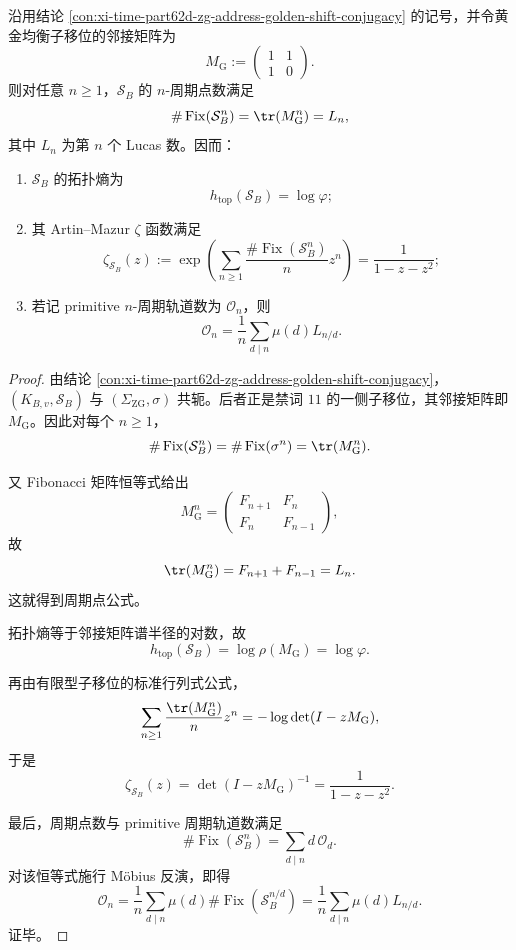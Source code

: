 \begin{conclusion}\label{con:xi-time-part62d-zg-address-lucas-entropy-zeta}
沿用结论 \ref{con:xi-time-part62d-zg-address-golden-shift-conjugacy} 的记号，并令黄金均衡子移位的邻接矩阵为
\[
M_{\mathrm G}:=
\begin{pmatrix}
1&1\\
1&0
\end{pmatrix}.
\]
则对任意 \(n\ge 1\)，\(\mathcal S_B\) 的 \(n\)-周期点数满足
\[
\#\operatorname{Fix}(\mathcal S_B^n)=\tr(M_{\mathrm G}^n)=L_n,
\]
其中 \(L_n\) 为第 \(n\) 个 Lucas 数。因而：
\begin{enumerate}
  \item \(\mathcal S_B\) 的拓扑熵为
  \[
  h_{\mathrm{top}}(\mathcal S_B)=\log\varphi;
  \]
  \item 其 Artin--Mazur \(\zeta\) 函数满足
  \[
  \zeta_{\mathcal S_B}(z)
  :=
  \exp\!\left(
  \sum_{n\ge 1}\frac{\#\operatorname{Fix}(\mathcal S_B^n)}{n}z^n
  \right)
  =
  \frac{1}{1-z-z^2};
  \]
  \item 若记 primitive \(n\)-周期轨道数为 \(\mathcal O_n\)，则
  \[
  \mathcal O_n
  =
  \frac{1}{n}\sum_{d\mid n}\mu(d)L_{n/d}.
  \]
\end{enumerate}
\end{conclusion}
\begin{proof}
由结论 \ref{con:xi-time-part62d-zg-address-golden-shift-conjugacy}，\((K_{B,v},\mathcal S_B)\) 与 \((\Sigma_{\mathrm{ZG}},\sigma)\) 共轭。后者正是禁词 \(11\) 的一侧子移位，其邻接矩阵即 \(M_{\mathrm G}\)。因此对每个 \(n\ge 1\)，
\[
\#\operatorname{Fix}(\mathcal S_B^n)
=
\#\operatorname{Fix}(\sigma^n)
=
\tr(M_{\mathrm G}^n).
\]

又 Fibonacci 矩阵恒等式给出
\[
M_{\mathrm G}^n=
\begin{pmatrix}
F_{n+1}&F_n\\
F_n&F_{n-1}
\end{pmatrix},
\]
故
\[
\tr(M_{\mathrm G}^n)=F_{n+1}+F_{n-1}=L_n.
\]
这就得到周期点公式。

拓扑熵等于邻接矩阵谱半径的对数，故
\[
h_{\mathrm{top}}(\mathcal S_B)=\log\rho(M_{\mathrm G})=\log\varphi.
\]

再由有限型子移位的标准行列式公式，
\[
\sum_{n\ge 1}\frac{\tr(M_{\mathrm G}^n)}{n}z^n
=
-\log\det(I-zM_{\mathrm G}),
\]
于是
\[
\zeta_{\mathcal S_B}(z)
=
\det(I-zM_{\mathrm G})^{-1}
=
\frac{1}{1-z-z^2}.
\]

最后，周期点数与 primitive 周期轨道数满足
\[
\#\operatorname{Fix}(\mathcal S_B^n)=\sum_{d\mid n}d\,\mathcal O_d.
\]
对该恒等式施行 Möbius 反演，即得
\[
\mathcal O_n
=
\frac{1}{n}\sum_{d\mid n}\mu(d)\#\operatorname{Fix}(\mathcal S_B^{n/d})
=
\frac{1}{n}\sum_{d\mid n}\mu(d)L_{n/d}.
\]
证毕。
\end{proof}


